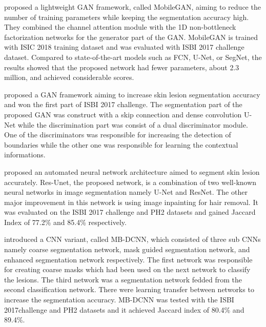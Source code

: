     \citet{sarker2019mobilegan} proposed a lightweight GAN framework, called MobileGAN, aiming to reduce the number of training parameters while keeping the segmentation accuracy high.
    They combined the channel attention module with the 1D non-bottleneck factorization networks for the generator part of the GAN.
    MobileGAN is trained with ISIC 2018 training dataset and was evaluated with ISBI 2017 challenge dataset.
    Compared to state-of-the-art models such as FCN, U-Net, or SegNet, the results showed that the proposed network had fewer parameters, about 2.3 million, and achieved considerable scores.

    \citet{lei2020skin} proposed a GAN framework aiming to increase skin lesion segmentation accuracy and won the first part of ISBI 2017 challenge.
    The segmentation part of the proposed GAN was construct with a skip connection and dense convolution U-Net while the discrimination part was consist of a dual discriminator module.
    One of the discriminators was responsible for increasing the detection of boundaries while the other one was responsible for learning the contextual informations.

    \citet{zafar2020skin} proposed an automated neural network architecture aimed to segment skin lesion accurately.
    Res-Unet, the proposed network, is a combination of two well-known neural networks in image segmentation namely U-Net and ResNet.
    The other major improvement in this network is using image inpainting for hair removal.
    It was evaluated on the ISBI 2017 challenge and PH2 datasets and gained Jaccard Index of 77.2\% and 85.4\%  respectively.

    \citet{xie2020mutual} introduced a CNN variant, called MB-DCNN, which consisted of three sub CNNs namely coarse segmentation network,
    mask guided segmentation network, and enhanced segmentation network respectively.
    The first network was responsible for creating coarse masks which had been used on the next network to classify the lesions.
    The third network was a segmentation network fedded from the second classification network.
    There were learning transfer between networks to increase the segmentation accuracy.
    MB-DCNN was tested with the ISBI 2017challenge and PH2 datasets and it achieved Jaccard index of 80.4\% and 89.4\%.

    
